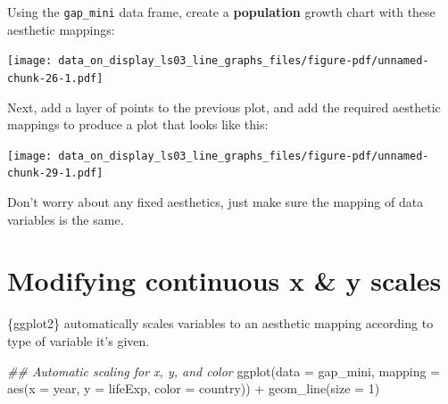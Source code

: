 \documentclass[
  letterpaper,
  DIV=11,
  numbers=noendperiod]{scrreprt}
\newenvironment{Shaded}{\begin{snugshade}}{\end{snugshade}}
\newcommand{\AttributeTok}[1]{\textcolor[rgb]{0.40,0.45,0.13}{#1}}
\newcommand{\DecValTok}[1]{\textcolor[rgb]{0.68,0.00,0.00}{#1}}
\newcommand{\DocumentationTok}[1]{\textcolor[rgb]{0.37,0.37,0.37}{\textit{#1}}}
\newcommand{\FunctionTok}[1]{\textcolor[rgb]{0.28,0.35,0.67}{#1}}
\newcommand{\NormalTok}[1]{\textcolor[rgb]{0.00,0.23,0.31}{#1}}
\newcommand{\SpecialCharTok}[1]{\textcolor[rgb]{0.37,0.37,0.37}{#1}}
\begin{document}
\begin{tcolorbox}[enhanced jigsaw, colframe=quarto-callout-tip-color-frame, rightrule=.15mm, opacityback=0, breakable, coltitle=black, colbacktitle=quarto-callout-tip-color!10!white, bottomrule=.15mm, leftrule=.75mm, toprule=.15mm, arc=.35mm, bottomtitle=1mm, colback=white, left=2mm, opacitybacktitle=0.6, titlerule=0mm, title=\textcolor{quarto-callout-tip-color}{\faLightbulb}\hspace{0.5em}{Practice}, toptitle=1mm]

Using the \texttt{gap\_mini} data frame, create a \textbf{population}
growth chart with these aesthetic mappings:

\texttt{[image: data\_on\_display\_ls03\_line\_graphs\_files/figure-pdf/unnamed-chunk-26-1.pdf]}

Next, add a layer of points to the previous plot, and add the required
aesthetic mappings to produce a plot that looks like this:

\texttt{[image: data\_on\_display\_ls03\_line\_graphs\_files/figure-pdf/unnamed-chunk-29-1.pdf]}

Don't worry about any fixed aesthetics, just make sure the mapping of
data variables is the same.

\end{tcolorbox}

\hypertarget{modifying-continuous-x-y-scales}{%
\section{Modifying continuous x \& y
scales}\label{modifying-continuous-x-y-scales}}

\{ggplot2\} automatically scales variables to an aesthetic mapping
according to type of variable it's given.

\begin{Shaded}
\begin{Highlighting}[]
\DocumentationTok{\#\# Automatic scaling for x, y, and color}
\FunctionTok{ggplot}\NormalTok{(}\AttributeTok{data =}\NormalTok{ gap\_mini,}
       \AttributeTok{mapping =} \FunctionTok{aes}\NormalTok{(}\AttributeTok{x =}\NormalTok{ year,}
                     \AttributeTok{y =}\NormalTok{ lifeExp,}
                     \AttributeTok{color =}\NormalTok{ country)) }\SpecialCharTok{+}
  \FunctionTok{geom\_line}\NormalTok{(}\AttributeTok{size =} \DecValTok{1}\NormalTok{)}
\end{Highlighting}
\end{Shaded}
\end{document}
